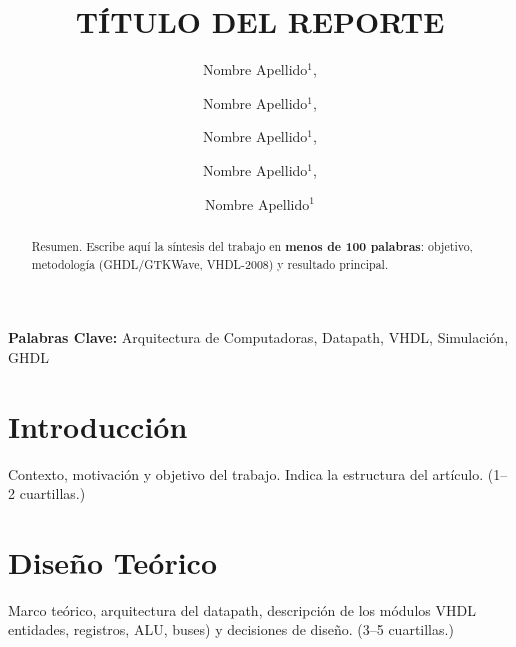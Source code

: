 \documentclass[llncs]{llncs}
\begin{document}
\title{TÍTULO DEL REPORTE}

\author{Nombre Apellido$^{1}$,%
\and Nombre Apellido$^{1}$,%
\and Nombre Apellido$^{1}$,%
\and Nombre Apellido$^{1}$,%
\and Nombre Apellido$^{1}$}


\maketitle

\begin{abstract}
Resumen. Escribe aquí la síntesis del trabajo en \textbf{menos de 100
palabras}: objetivo, metodología (GHDL/GTKWave, VHDL-2008) y resultado
principal.
\end{abstract}

\noindent\textbf{Palabras Clave:} Arquitectura de Computadoras, Datapath,
VHDL, Simulación, GHDL

\section{Introducción}
\label{sec:intro}

Contexto, motivación y objetivo del trabajo. Indica la estructura del
artículo. (1--2 cuartillas.)

\section{Diseño Teórico}
\label{sec:diseno}

Marco teórico, arquitectura del datapath, descripción de los módulos VHDL
entidades, registros, ALU, buses) y decisiones de diseño. (3--5 cuartillas.)
\end{document}
